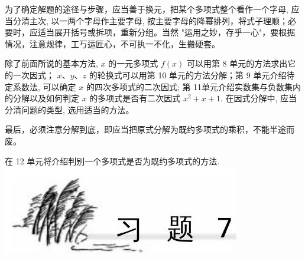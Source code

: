 \documentclass[10pt]{article}
\begin{document}
为了确定解题的途径与步骤，应当善于换元，把某个多项式整个看作一个字母, 应当分清主次, 以一两个字母作主要字母, 按主要字母的降幂排列，将式子理顺；必要时，应适当展开括号或拆项，重新分组。当然 "运用之妙，存乎一心"，要根据情况，注意规律，工丂运匠心，不可执一不化，生搬硬套。

除了前面所说的基本方法, $x$ 的一元多项式 $f(x)$ 可以用第 8 单元的方法求出它的一次因式； $x 、 y 、 z$ 的轮换式可以用第 10 单元的方法分解；第 9 单元介绍待定系数法, 可以确定 $x$ 的四次多项式的二次因式; 第 11单元介绍实数集与负数集内的分解以及如何判定 $x$ 的多项式是否有二次因式 $x^{2}+x+1$. 在因式分解中, 应当分清问题的类型, 选用适当的方法。

最后，必须注意分解到底，即应当把原式分解为既约多项式的乘积，不能半途而废。

在 12 单元将介绍判别一个多项式是否为既约多项式的方法.\\
\includegraphics[max width=\textwidth, center]{2024_10_30_bd799899fef40368a068g-054}
\end{document}
